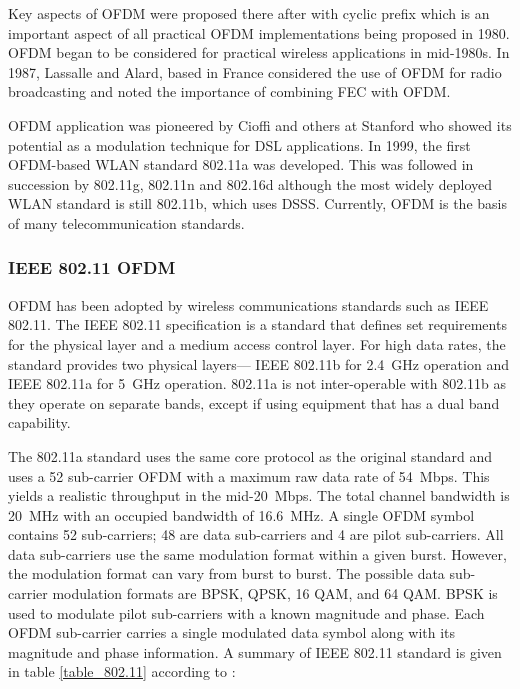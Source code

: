 Key aspects of \gls{OFDM} were proposed there after with cyclic prefix which is an important aspect of all practical \gls{OFDM} implementations being proposed in 1980. \gls{OFDM} began to be considered for practical wireless applications in mid-1980s. In 1987, Lassalle and Alard, based in France considered the use of \gls{OFDM} for radio broadcasting and noted the importance of combining \gls{FEC} with \gls{OFDM}\cite{history_ofdm}. 

\gls{OFDM} application was pioneered by Cioffi and others at Stanford who showed its potential as a modulation technique for \gls{DSL} applications. In 1999, the first \gls{OFDM}-based \gls{WLAN} standard 802.11a was developed. This was followed in succession by 802.11g, 802.11n and 802.16d although the most widely deployed \gls{WLAN} standard is still 802.11b, which uses \gls{DSSS}. Currently, \gls{OFDM} is the basis of many telecommunication standards.

\subsubsection{IEEE 802.11 OFDM}
\gls{OFDM} has been adopted by wireless communications standards such as IEEE 802.11. The IEEE 802.11 specification is a standard that defines set requirements for the physical layer and a medium access control layer. For high data rates, the standard provides two physical layers--- IEEE 802.11b for \SI{2.4}{\giga\hertz} operation and IEEE 802.11a for \SI{5}{\giga\hertz} operation\cite{802.11}. 802.11a is not inter-operable with 802.11b as they operate on separate bands, except if using equipment that has a dual band capability.

The 802.11a standard uses the same core protocol as the original standard and uses a 52 sub-carrier \gls{OFDM} with a maximum raw data rate of \SI{54}{Mbps}. This yields a realistic throughput in the mid-\SI{20}{Mbps}. The total channel bandwidth is \SI{20}{\mega\hertz} with an occupied bandwidth of \SI{16.6}{\mega\hertz}. A single \gls{OFDM} symbol contains 52 sub-carriers; 48 are data sub-carriers and 4 are pilot sub-carriers. All data sub-carriers use the same modulation format within a given burst. However, the modulation format can vary from burst to burst. The possible data sub-carrier modulation formats are \gls{BPSK}, \gls{QPSK}, 16 \gls{QAM}, and 64 \gls{QAM}. \gls{BPSK} is used to modulate pilot sub-carriers with a known magnitude and phase. Each \gls{OFDM} sub-carrier carries a single modulated data symbol along with its magnitude and phase information. A summary of IEEE 802.11 standard is given in table \ref{table_802.11} according to \cite{IEEE}:
 
